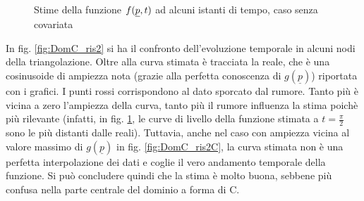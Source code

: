 \documentclass[a4paper,11pt,twoside,openright]{book}							%
\begin{document}
\begin{figure}[H]
{   }
	\caption{Stime della funzione $f(\protect\underline{p},t)$ ad alcuni istanti di tempo, caso senza covariata}
	\label{fig:DomC_ris}
\end{figure}

In fig. \ref{fig:DomC_ris2} si ha il confronto dell'evoluzione temporale in alcuni nodi della triangolazione. Oltre alla curva stimata è tracciata la reale, che è una cosinusoide di ampiezza nota (grazie alla perfetta conoscenza di $g(\underline p)$) riportata con i grafici. I punti rossi corrispondono al dato sporcato dal rumore. Tanto più è vicina a zero l'ampiezza della curva, tanto più il rumore influenza la stima poichè più rilevante (infatti, in fig. \ref{fig:DomC_ris}, le curve di livello della funzione stimata a $t=\frac{\pi}{2}$ sono le più distanti dalle reali). Tuttavia, anche nel caso con ampiezza vicina al valore massimo di $g(\underline p)$ in fig. \ref{fig:DomC_ris2C}, la curva stimata non è una perfetta interpolazione dei dati e coglie il vero andamento temporale della funzione. Si può concludere quindi che la stima è molto buona, sebbene più confusa nella parte centrale del dominio a forma di C.
\end{document}
